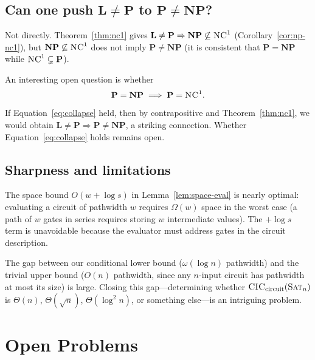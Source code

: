 \documentclass[11pt]{article}
\newcommand{\SAT}{\textsc{Sat}}
\newcommand{\CIC}{\textsc{CIC}}
\newcommand{\NC}{\textsc{NC}}
\begin{document}
\subsection{Can one push $\mathbf{L} \neq \mathbf{P}$ to
$\mathbf{P} \neq \mathbf{NP}$?}

Not directly.  Theorem~\ref{thm:nc1} gives
$\mathbf{L} \neq \mathbf{P} \Rightarrow \mathbf{NP} \not\subseteq \NC^1$
(Corollary~\ref{cor:np-nc1}), but $\mathbf{NP} \not\subseteq \NC^1$ does not
imply $\mathbf{P} \neq \mathbf{NP}$ (it is consistent that
$\mathbf{P} = \mathbf{NP}$ while $\NC^1 \subsetneq \mathbf{P}$).

An interesting open question is whether
\begin{equation}
\label{eq:collapse}
\mathbf{P} = \mathbf{NP} \;\Longrightarrow\; \mathbf{P} = \NC^1.
\end{equation}
If Equation~\eqref{eq:collapse} held, then by contrapositive and
Theorem~\ref{thm:nc1}, we would obtain $\mathbf{L} \neq \mathbf{P}
\Rightarrow \mathbf{P} \neq \mathbf{NP}$, a striking connection.
Whether Equation~\eqref{eq:collapse} holds remains open.

\subsection{Sharpness and limitations}

The space bound $O(w + \log s)$ in Lemma~\ref{lem:space-eval} is nearly
optimal: evaluating a circuit of pathwidth $w$ requires $\Omega(w)$ space in
the worst case (a path of $w$ gates in series requires storing $w$
intermediate values).  The $+ \log s$ term is unavoidable because the
evaluator must address gates in the circuit description.

The gap between our conditional lower bound ($\omega(\log n)$ pathwidth) and
the trivial upper bound ($O(n)$ pathwidth, since any $n$-input circuit has
pathwidth at most its size) is large.  Closing this gap---determining
whether $\CIC_{\text{circuit}}(\SAT_n)$ is $\Theta(n)$, $\Theta(\sqrt{n})$,
$\Theta(\log^2 n)$, or something else---is an intriguing problem.

\section*{Open Problems}
\end{document}
